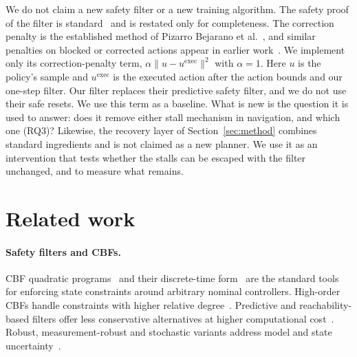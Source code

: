 \documentclass[11pt]{article}
\theoremstyle{definition}
\theoremstyle{remark}
\begin{document}
We do not claim a new safety filter or a new training algorithm. The safety proof of the filter is standard~\cite{agrawal2017discrete} and is restated only for completeness. The correction penalty is the established method of Pizarro Bejarano et al.~\cite{pizarro2025filtering}, and similar penalties on blocked or corrected actions appear in earlier work~\cite{alshiekh2018shielding,saunders2018trial,krasowski2023provably}. We implement only its correction-penalty term, $\alpha\lVert u-u^{\mathrm{exec}}\rVert^2$ with $\alpha=1$. Here $u$ is the policy's sample and $u^{\mathrm{exec}}$ is the executed action after the action bounds and our one-step filter. Our filter replaces their predictive safety filter, and we do not use their safe resets. We use this term as a baseline. What is new is the question it is used to answer: does it remove either stall mechanism in navigation, and which one (RQ3)? Likewise, the recovery layer of Section~\ref{sec:method} combines standard ingredients and is not claimed as a new planner. We use it as an intervention that tests whether the stalls can be escaped with the filter unchanged, and to measure what remains.

\section{Related work}
\paragraph{Safety filters and CBFs.} CBF quadratic programs~\cite{ames2017cbfqp,ames2019cbf} and their discrete-time form~\cite{agrawal2017discrete,zeng2021mpcdcbf} are the standard tools for enforcing state constraints around arbitrary nominal controllers. High-order CBFs handle constraints with higher relative degree~\cite{xiao2022hocbf}. Predictive and reachability-based filters offer less conservative alternatives at higher computational cost~\cite{wabersich2021psf,hsu2024safetyfilter}. Robust, measurement-robust and stochastic variants address model and state uncertainty~\cite{kolathaya2019issf,cosner2021mrcbf,cosner2023stochastic,das2026robust}.
\end{document}
